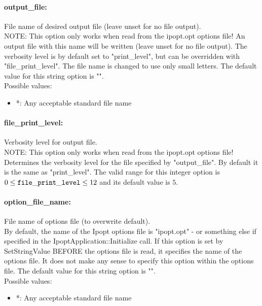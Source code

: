 \paragraph{output\_file:}\label{sec:output_file} File name of desired output file (leave unset for no file output). $\;$ \\
 NOTE: This option only works when read from the
ipopt.opt options file! An output file with this
name will be written (leave unset for no file
output).  The verbosity level is by default set
to "print\_level", but can be overridden with
"file\_print\_level".  The file name is changed
to use only small letters.
The default value for this string option is "".
\\ 
Possible values:
\begin{itemize}
   \item *: Any acceptable standard file name
\end{itemize}

\paragraph{file\_print\_level:}\label{sec:file_print_level} Verbosity level for output file. $\;$ \\
 NOTE: This option only works when read from the
ipopt.opt options file! Determines the verbosity
level for the file specified by "output\_file". 
By default it is the same as "print\_level". The valid range for this integer option is
$0 \le {\tt file\_print\_level } \le 12$
and its default value is $5$.


\paragraph{option\_file\_name:}\label{sec:option_file_name} File name of options file (to overwrite default). $\;$ \\
 By default, the name of the Ipopt options file is
"ipopt.opt" - or something else if specified in
the IpoptApplication::Initialize call. If this
option is set by SetStringValue BEFORE the
options file is read, it specifies the name of
the options file.  It does not make any sense to
specify this option within the options file.
The default value for this string option is "".
\\ 
Possible values:
\begin{itemize}
   \item *: Any acceptable standard file name
\end{itemize}



